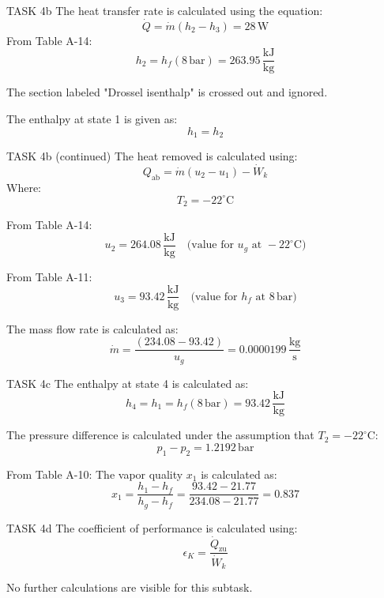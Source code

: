 TASK 4b  
The heat transfer rate is calculated using the equation:  
\[
\dot{Q} = \dot{m} (h_2 - h_3) = 28 \, \text{W}
\]  
From Table A-14:  
\[
h_2 = h_f(8 \, \text{bar}) = 263.95 \, \frac{\text{kJ}}{\text{kg}}
\]  

The section labeled "Drossel isenthalp" is crossed out and ignored.  

The enthalpy at state 1 is given as:  
\[
h_1 = h_2
\]  

TASK 4b (continued)  
The heat removed is calculated using:  
\[
Q_{\text{ab}} = \dot{m} (u_2 - u_1) - \dot{W}_k
\]  
Where:  
\[
T_2 = -22^\circ\text{C}
\]  

From Table A-14:  
\[
u_2 = 264.08 \, \frac{\text{kJ}}{\text{kg}} \quad \text{(value for } u_g \text{ at } -22^\circ\text{C)}  
\]  

From Table A-11:  
\[
u_3 = 93.42 \, \frac{\text{kJ}}{\text{kg}} \quad \text{(value for } h_f \text{ at } 8 \, \text{bar)}  
\]  

The mass flow rate is calculated as:  
\[
\dot{m} = \frac{(234.08 - 93.42)}{u_g} = 0.0000199 \, \frac{\text{kg}}{\text{s}}
\]  

TASK 4c  
The enthalpy at state 4 is calculated as:  
\[
h_4 = h_1 = h_f(8 \, \text{bar}) = 93.42 \, \frac{\text{kJ}}{\text{kg}}
\]  

The pressure difference is calculated under the assumption that \( T_2 = -22^\circ\text{C} \):  
\[
p_1 - p_2 = 1.2192 \, \text{bar}
\]  

From Table A-10:  
The vapor quality \( x_1 \) is calculated as:  
\[
x_1 = \frac{h_1 - h_f}{h_g - h_f} = \frac{93.42 - 21.77}{234.08 - 21.77} = 0.837
\]  

TASK 4d  
The coefficient of performance is calculated using:  
\[
\epsilon_K = \frac{\dot{Q}_{\text{zu}}}{\dot{W}_k}
\]  

No further calculations are visible for this subtask.